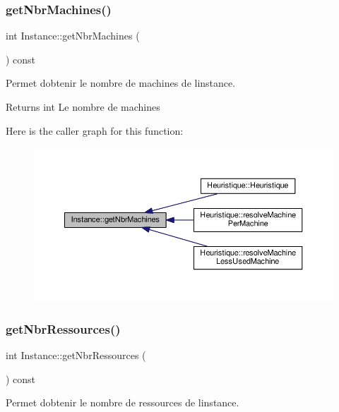 \subsubsection{\texorpdfstring{get\+Nbr\+Machines()}{getNbrMachines()}}
{\footnotesize\ttfamily int Instance\+::get\+Nbr\+Machines (\begin{DoxyParamCaption}{ }\end{DoxyParamCaption}) const}



Permet d\textquotesingle{}obtenir le nombre de machines de l\textquotesingle{}instance. 

\begin{DoxyReturn}{Returns}
int Le nombre de machines 
\end{DoxyReturn}
Here is the caller graph for this function\+:\nopagebreak
\begin{figure}[H]
\begin{center}
\leavevmode
\includegraphics[width=350pt]{classInstance_a7151797f760b20d6fc3be88ecb7b2a4b_icgraph}
\end{center}
\end{figure}
\mbox{\label{classInstance_aa69a89ba7a29d4ca426ffe4b1922cac6}} 
\subsubsection{\texorpdfstring{get\+Nbr\+Ressources()}{getNbrRessources()}}
{\footnotesize\ttfamily int Instance\+::get\+Nbr\+Ressources (\begin{DoxyParamCaption}{ }\end{DoxyParamCaption}) const}



Permet d\textquotesingle{}obtenir le nombre de ressources de l\textquotesingle{}instance. 

